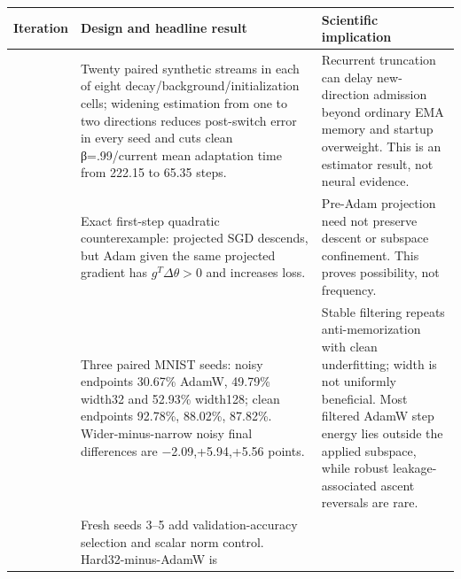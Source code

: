 \documentclass[
  british,
  10pt,
  a4paper,
]{article}
\newcounter{none} %
\begin{document}
{\def\LTcaptype{none} %
\begin{longtable}[]{@{}
  >{\raggedleft\arraybackslash}p{}
  >{\raggedright\arraybackslash}p{}
  >{\raggedright\arraybackslash}p{}@{}}
\toprule\noalign{}
\begin{minipage}[b]{\linewidth}\raggedleft
Iteration
\end{minipage} & \begin{minipage}[b]{\linewidth}\raggedright
Design and headline result
\end{minipage} & \begin{minipage}[b]{\linewidth}\raggedright
Scientific implication
\end{minipage} \\
\midrule\noalign{}
\endhead
\bottomrule\noalign{}
\endlastfoot
001 & Twenty paired synthetic streams in each of eight
decay/\allowbreak{}background/\allowbreak{}initializati\allowbreak{}on
cells; widening estimation from one to two directions reduces
post-\allowbreak{}switch error in every seed and cuts clean
β=\allowbreak{}.\allowbreak{}99/\allowbreak{}current mean adaptation
time from 222.15 to 65.35 steps. & Recurrent truncation can delay
new-\allowbreak{}direction admission beyond ordinary EMA memory and
startup overweight.\allowbreak{} This is an estimator result, not neural
evidence. \\
002 & Exact first-step quadratic counterexample: projected SGD descends,
but Adam given the same projected gradient has \(g^T\Delta\theta>0\) and
increases loss. & Pre-Adam projection need not preserve descent or
subspace confinement.\allowbreak{} This proves possibility,\allowbreak{}
not frequency. \\
003 & Three paired MNIST seeds: noisy endpoints 30.67\% AdamW, 49.79\%
width32 and 52.93\% width128; clean endpoints 92.78\%, 88.02\%, 87.82\%.
Wider-\allowbreak{}minus-\allowbreak{}narrow noisy final differences are
−2.\allowbreak{}09,\allowbreak{}+5.\allowbreak{}94,\allowbreak{}+5.\allowbreak{}56
points. & Stable filtering repeats
anti-\allowbreak{}memorization\allowbreak{} with clean underfitting;
width is not uniformly beneficial.\allowbreak{} Most filtered AdamW step
energy lies outside the applied subspace, while robust
leakage-\allowbreak{}associated ascent reversals are rare. \\
004 & Fresh seeds 3--5 add validation-\allowbreak{}accuracy selection
and scalar norm control. Hard32-\allowbreak{}minus-\allowbreak{}AdamW is

\end{longtable}}
\end{document}
